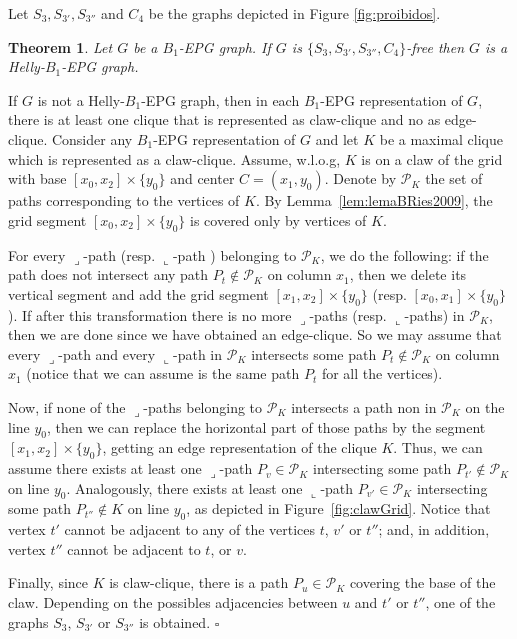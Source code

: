 \documentclass[9pt]{entcs}
\newtheorem{teo}[thm]{Theorem}%
\begin{document}
Let $S_{3}, S_{3'}, S_{3''}$ and $ C_{4}$ be the graphs depicted in Figure \ref{fig:proibidos}. 


\begin{teo}
\label{lem:chordalDiamondFree}
Let $G$ be a $B_1$-EPG graph. If $G$ is  $\{S_{3}, S_{3'}, S_{3''}, C_{4}\}$-free then $G$  is a Helly-$B_1$-EPG graph.
\end{teo}

\begin{pf}
If $G$ is not a Helly-$B_1$-EPG graph, then in each $B_1$-EPG representation of $G$, there is at least one clique that is represented as claw-clique and no as edge-clique. Consider any $B_1$-EPG  representation of $G$  and let $K$ be a maximal clique  which is represented as a claw-clique. Assume, w.l.o.g,  $K$ is on a claw of the grid with base $[x_0, x_2]\times\{y_0\}$ and center $C = (x_1, y_0)$. Denote by  $\mathcal{P}_K$ the set of paths corresponding to the vertices of $K$.  By Lemma~\ref{lem:lemaBRies2009},  %
the grid segment $[x_0, x_2]\times\{y_0\}$ is covered only by vertices of $K$. %


 For every ${\displaystyle \lrcorner}$-path %
 (resp. ${\displaystyle \llcorner}$-path 
 ) belonging to $\mathcal{P}_K$, we do the following: if %
 the path does not intersect any path $P_t \notin\mathcal{P}_K$ on column $x_1$, then we delete its vertical segment and add the grid segment $[x_1, x_2]\times\{y_0\}$ (resp. $[x_0, x_1]\times\{y_0\}$). If after this transformation there is no more ${\displaystyle \lrcorner}$-paths (resp. ${\displaystyle \llcorner}$-paths) in $\mathcal{P}_K$, then we are done since we have obtained an edge-clique. So we may assume that
 every ${\displaystyle \lrcorner}$-path   and every ${\displaystyle \llcorner}$-path  in $ \mathcal{P}_K$ intersects some path $P_t \notin \mathcal{P}_K$   on column $x_1$ (notice that we can assume is the same path $P_t$ for all the vertices). 
 
 Now, if none of the ${\displaystyle \lrcorner}$-paths belonging to $\mathcal{P}_K$ intersects  a path non in  $ \mathcal{P}_K$ on the line $y_0$, then we can replace the horizontal part of those paths by the segment $[x_1,x_2]\times \{y_0\}$, getting an edge representation of the clique $K$. Thus, we can assume there exists
 at least one ${\displaystyle \lrcorner}$-path $P_{v} \in \mathcal{P}_K$ intersecting some path  $P_{t'} \notin \mathcal{P}_K$ on line $y_0$. Analogously, there exists
 at least one ${\displaystyle \llcorner}$-path $P_{v'} \in \mathcal{P}_K$ intersecting some path  $P_{t''} \notin K$ on line $y_0$, as depicted in Figure~\ref{fig:clawGrid}. Notice that vertex $t'$ cannot be adjacent to any of the vertices $t$, $v'$ or $t''$; and, in addition, vertex $t''$ cannot
 be adjacent to   $t$,  or $v$.
 
 Finally,   since $K$ is claw-clique,  there is a path $P_u \in \mathcal{P}_K$ covering the base of the claw. Depending on the 
 possibles adjacencies between  $u$ and $t'$ or  $t''$, one of the graphs  $S_{3}$, $S_{3'}$ or $S_{3''}$ is obtained.
$\square$
\end{pf}
\end{document}
